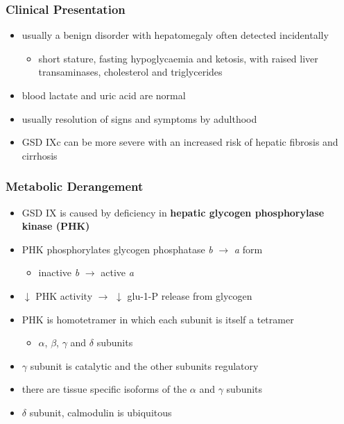 \documentclass[12pt]{scrartcl}
\begin{document}
\subsubsection{Clinical Presentation}
\label{sec:org744df2e}
\begin{itemize}
\item usually a benign disorder with hepatomegaly often detected
incidentally
\begin{itemize}
\item short stature, fasting hypoglycaemia and ketosis, with
raised liver transaminases, cholesterol and triglycerides
\end{itemize}
\item blood lactate and uric acid are normal
\item usually resolution of signs and symptoms by adulthood
\item GSD IXc can be more severe with an increased risk of hepatic fibrosis and cirrhosis
\end{itemize}
\subsubsection{Metabolic Derangement}
\label{sec:orgc9bc612}
\begin{itemize}
\item GSD IX is caused by deficiency in \textbf{hepatic glycogen phosphorylase kinase (PHK)}
\item PHK phosphorylates glycogen phosphatase \emph{b} \(\to\) \emph{a} form
\begin{itemize}
\item inactive \emph{b} \(\to\)  active \emph{a}
\end{itemize}
\item \(\downarrow\) PHK activity \(\to\) \(\downarrow\) glu-1-P release from glycogen
\item PHK is homotetramer in which each subunit is itself a tetramer
\begin{itemize}
\item \(\alpha\), \(\beta\), \(\gamma\) and \(\delta\) subunits
\end{itemize}
\item \(\gamma\) subunit is catalytic and the other subunits regulatory
\item there are tissue specific isoforms of the \(\alpha\) and \(\gamma\) subunits
\item \(\delta\) subunit, calmodulin is ubiquitous
\end{itemize}
\end{document}
